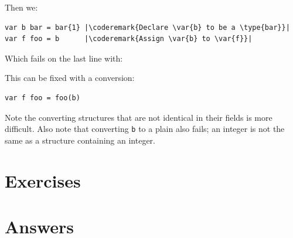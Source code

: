 Then we:
\begin{lstlisting}
var b bar = bar{1} |\coderemark{Declare \var{b} to be a \type{bar}}|
var f foo = b	   |\coderemark{Assign \var{b} to \var{f}}|
\end{lstlisting}
Which fails on the last line with:

\noindent{}

\noindent{}This can be fixed with a conversion:
\begin{lstlisting}
var f foo = foo(b)
\end{lstlisting}
Note the converting structures that are not identical in their fields
is more difficult. Also note that converting \lstinline{b} to a plain
 also fails; an integer is not the same as a structure containing
an integer.

\section{Exercises}










\cleardoublepage
\section{Answers}
\shipoutAnswer
